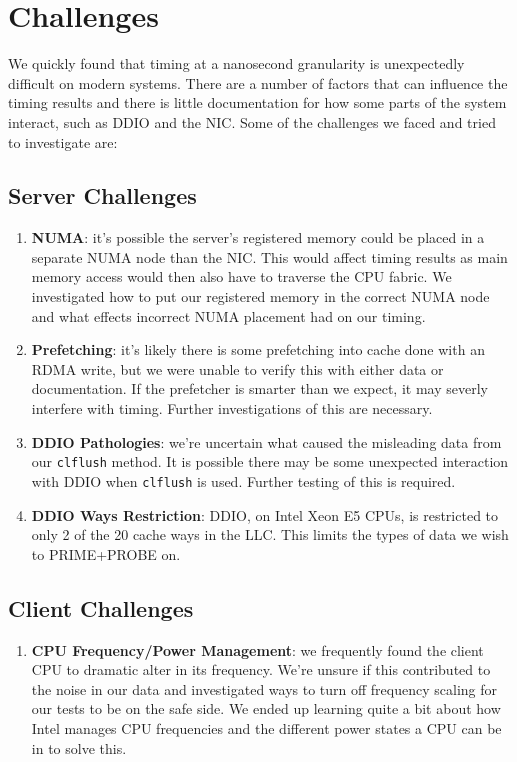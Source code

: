\documentclass[twocolumn]{article}
\begin{document}
\section{Challenges}
We quickly found that timing at a nanosecond granularity is unexpectedly difficult on modern systems.
There are a number of factors that can influence the timing results and there is little documentation for how some parts of the system interact, such as DDIO and the NIC.
Some of the challenges we faced and tried to investigate are:
\subsection{Server Challenges}
\begin{enumerate}
 \item \textbf{NUMA}: it's possible the server's registered memory could be placed in a separate NUMA node than the NIC.
       This would affect timing results as main memory access would then also have to traverse the CPU fabric.
       We investigated how to put our registered memory in the correct NUMA node and what effects incorrect NUMA placement had on our timing.
 \item \textbf{Prefetching}: it's likely there is some prefetching into cache done with an RDMA write, but we were unable to verify this with either data or documentation.
       If the prefetcher is smarter than we expect, it may severly interfere with timing. Further investigations of this are necessary.
 \item \textbf{DDIO Pathologies}: we're uncertain what caused the misleading data from our \texttt{clflush} method.
       It is possible there may be some unexpected interaction with DDIO when \texttt{clflush} is used.
       Further testing of this is required.
 \item \textbf{DDIO Ways Restriction}: DDIO, on Intel Xeon E5 CPUs, is restricted to only 2 of the 20 cache ways in the LLC.
       This limits the types of data we wish to PRIME+PROBE on.
\end{enumerate}

\subsection{Client Challenges}
\begin{enumerate}
 \item \textbf{CPU Frequency/Power Management}: we frequently found the client CPU to dramatic alter in its frequency.
       We're unsure if this contributed to the noise in our data and investigated ways to turn off frequency scaling for our tests to be on the safe side.
       We ended up learning quite a bit about how Intel manages CPU frequencies and the different power states a CPU can be in to solve this.
\end{enumerate}
\end{document}
